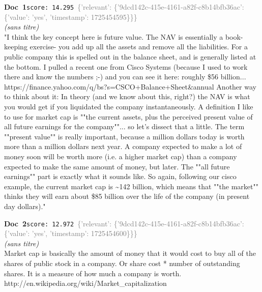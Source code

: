 \documentclass[a4paper,11pt]{article}
\begin{document}
\begin{docenv}
{\footnotesize\textcolor{doccolor}{\textbf{Doc~1}}}\hfill{\tiny\texttt{score:~14.295}}\ {\tiny\textcolor{gray}{\{'relevant': \{'9dcd142c-415e-4161-a82f-c8b14bfb36ac': \{'value': 'yes', 'timestamp': 1725454595\}\}\}}}\\[3pt]
{\small\textit{(sans titre)}}\\[2pt]
\vspace{2pt}
{\footnotesize 
"I think the key concept here is future value.  The NAV is essentially a book-keeping exercise- you add up all the assets and remove all the liabilities.  For a public company this is spelled out in the balance sheet, and is generally listed at the bottom.  I pulled a recent one from Cisco Systems (because I used to work there and know the numbers  ;-) and you can see it here: roughly \$56 billion... https://finance.yahoo.com/q/bs?s=CSCO+Balance+Sheet\&annual  Another way to think about it: In theory (and we know about this, right?) the NAV is what you would get if you liquidated the company instantaneously.  A definition I like to use for market cap is ""the current assets, plus the perceived present value of all future earnings for the company""... so let's dissect that a little.  The term ""present value"" is really important, because a million dollars today is worth more than a million dollars next year.  A company expected to make a lot of money soon will be worth more (i.e. a higher market cap) than a company expected to make the same amount of money, but later.  The ""all future earnings"" part is exactly what it sounds like.  So again, following our cisco example, the current market cap is \textasciitilde{}142 billion, which means that ""the market"" thinks they will earn about \$85 billion over the life of the company (in present day dollars)."}
\end{docenv}
\begin{docenv}
{\footnotesize\textcolor{doccolor}{\textbf{Doc~2}}}\hfill{\tiny\texttt{score:~12.972}}\ {\tiny\textcolor{gray}{\{'relevant': \{'9dcd142c-415e-4161-a82f-c8b14bfb36ac': \{'value': 'yes', 'timestamp': 1725454600\}\}\}}}\\[3pt]
{\small\textit{(sans titre)}}\\[2pt]
\vspace{2pt}
{\footnotesize 
Market cap is basically the amount of money that it would cost to buy all of the shares of public stock in a company.  Or  share cost * number of outstanding shares. It is a measure of how much a company is worth. http://en.wikipedia.org/wiki/Market\_capitalization}
\end{docenv}
\end{document}
